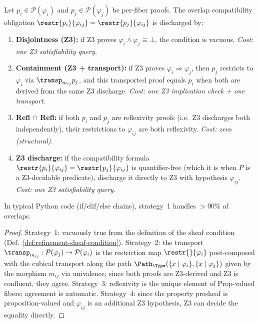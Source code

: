 \begin{proposition}
\label{prop:overlap-strategies}
Let $p_i \in \mathcal{P}(\varphi_i)$ and $p_j \in \mathcal{P}(\varphi_j)$
be per-fiber proofs.  The overlap compatibility obligation
$\restr{p_i}{\varphi_{ij}} = \restr{p_j}{\varphi_{ij}}$ is discharged by:
\begin{enumerate}
\item \textbf{Disjointness (Z3):} if Z3 proves
  $\varphi_i \wedge \varphi_j \equiv \bot$, the condition is vacuous.
  \emph{Cost: one Z3 satisfiability query.}
\item \textbf{Containment (Z3 + transport):} if Z3 proves
  $\varphi_i \Rightarrow \varphi_j$, then $p_j$ restricts to $\varphi_i$
  via $\transp_{m_{ij}} p_j$, and this transported proof equals $p_i$
  when both are derived from the same Z3 discharge.
  \emph{Cost: one Z3 implication check + one transport.}
\item \textbf{Refl $\cap$ Refl:} if both $p_i$ and $p_j$ are
  reflexivity proofs (i.e.\ Z3 discharges both independently), their
  restrictions to $\varphi_{ij}$ are both reflexivity.
  \emph{Cost: zero (structural).}
\item \textbf{Z3 discharge:} if the compatibility formula
  $\restr{p_i}{\varphi_{ij}} = \restr{p_j}{\varphi_{ij}}$ is
  quantifier-free (which it is when $P$ is a Z3-decidable predicate),
  discharge it directly to Z3 with hypothesis $\varphi_{ij}$.
  \emph{Cost: one Z3 satisfiability query.}
\end{enumerate}
In typical Python code (if/elif/else chains), strategy~1 handles
$> 90\%$ of overlaps.
\end{proposition}

\begin{proof}
Strategy~1: vacuously true from the definition of the sheaf condition
(Def.~\ref{def:refinement-sheaf-condition}).
Strategy~2: the transport $\transp_{m_{ij}} : \mathcal{P}(\varphi_j) \to
\mathcal{P}(\varphi_i)$ is the restriction map $\restr{}{\varphi_i}$
post-composed with the cubical transport along the path
$\Path_\Type(\{x\mid\varphi_i\}, \{x\mid\varphi_j\})$ given by the morphism
$m_{ij}$ via univalence; since both proofs are Z3-derived and Z3 is
confluent, they agree.
Strategy~3: reflexivity is the unique element of $\mathrm{Prop}$-valued
fibers; agreement is automatic.
Strategy~4: since the property presheaf is proposition-valued and
$\varphi_{ij}$ is an additional Z3 hypothesis, Z3 can decide the equality
directly.
\end{proof}

